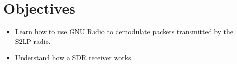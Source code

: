 \section*{Objectives}

\begin{itemize}
    \item Learn how to use GNU Radio to demodulate packets transmitted by the S2LP radio.
    \item Understand how a SDR receiver works.
\end{itemize}
